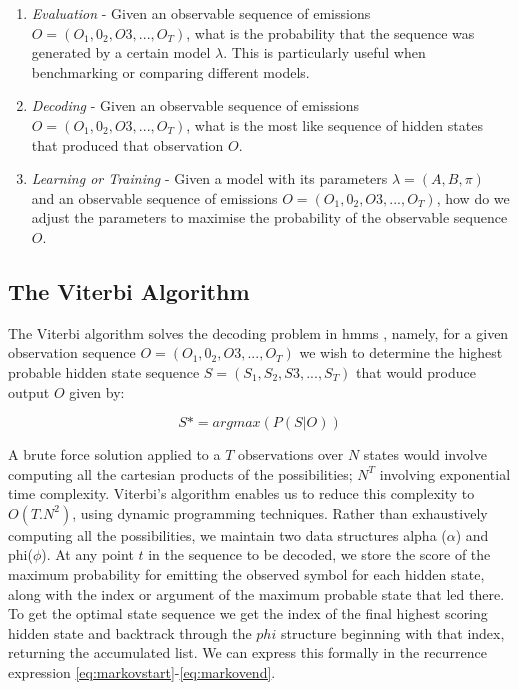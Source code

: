 {{{{{{{\begin{enumerate}
  \item \textit{Evaluation}  - Given an observable sequence of emissions $O = (O_1, 0_2, O3,..., O_T)$, what is the probability that the sequence was generated by a certain model $\lambda$. This is particularly useful when benchmarking or comparing different models. 

\item \textit{Decoding} - Given an observable sequence of emissions $O = (O_1, 0_2, O3,..., O_T)$, what is the most like sequence of hidden states that produced that observation $O$.

\item \textit{Learning or Training} - Given a model with its parameters $\lambda = (A, B, \pi)$ and an observable sequence of emissions $O = (O_1, 0_2, O3,..., O_T)$, how do we adjust the parameters to maximise the probability of the observable sequence $O$.
\end{enumerate}

\subsection{The Viterbi Algorithm}

The Viterbi algorithm solves the decoding problem in \acrshort{hmm}s \citep{Rabiner1989}, namely, for a given observation sequence $O = (O_1, 0_2, O3,..., O_T)$  we wish to determine the highest probable hidden state sequence $S = (S_1, S_2, S3,..., S_T)$ that would produce output $O$ given by:

\begin{equation}
\label{eq:Precision}	
S*=argmax (P(S|O))
\end{equation}  

A brute force solution applied to a $T$ observations over $N$ states would involve computing all the cartesian products of the possibilities; $N^T$ involving exponential time complexity. Viterbi’s algorithm enables us to reduce this complexity to $O(T.N^2)$, using dynamic programming techniques. Rather than exhaustively computing all the possibilities, we maintain two data structures alpha ($\alpha$) and phi($\phi$). At any point $t$ in the sequence to be decoded, we store the score of the maximum probability for emitting the observed symbol for each hidden state, along with the index or argument of the maximum probable state that led there. To get the optimal state sequence we get the index of the final highest scoring hidden state and backtrack through the $phi$ structure beginning with that index, returning the accumulated list. We can express this formally in the recurrence expression \ref{eq:markovstart}-\ref{eq:markovend}.

}}}}}}}
